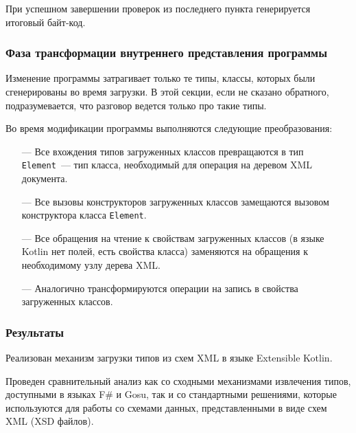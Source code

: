 При успешном завершении проверок из последнего пункта генерируется итоговый байт-код.
  
\subsubsection{Фаза трансформации внутреннего представления программы}\label{tranformation-phase}
Изменение программы затрагивает только те типы, классы, которых были сгенерированы во время загрузки. В этой секции, если не сказано обратного, подразумевается, что разговор ведется только про такие типы.

Во время модификации программы выполняются следующие преобразования:
\begin{itemize}
\item[---] Все вхождения типов загруженных классов превращаются в тип \texttt{Element}~--- тип класса, необходимый для операция на деревом XML документа.
\item[---] Все вызовы конструкторов загруженных классов замещаются вызовом конструктора класса \texttt{Element}.
\item[---] Все обращения на чтение к свойствам загруженных классов (в языке Kotlin нет полей, есть свойства класса) заменяются на обращения к необходимому узлу дерева XML.
\item[---] Аналогично трансформируются операции на запись в свойства загруженных классов.
\end{itemize}

\subsubsection{Результаты}
Реализован механизм загрузки типов из схем XML в языке Extensible Kotlin.

Проведен сравнительный анализ как со сходными механизмами извлечения типов, доступными в языках F\# и Gosu, так и со стандартными решениями, которые используются для работы со схемами данных, представленными в виде схем XML (XSD файлов).